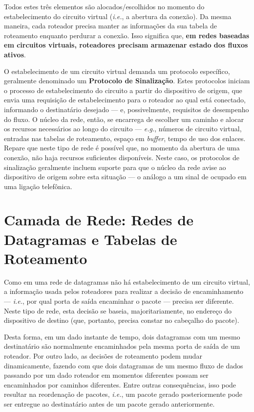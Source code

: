 \documentclass{article}
\begin{document}
Todos estes três elementos são alocados/escolhidos no momento do estabelecimento do circuito virtual (\textit{i.e.}, a abertura da conexão). Da mesma maneira, cada roteador precisa manter as informações da sua tabela de roteamento enquanto perdurar a conexão. Isso significa que, \textbf{em redes baseadas em circuitos virtuais, roteadores precisam armazenar estado dos fluxos ativos}.

O estabelecimento de um circuito virtual demanda um protocolo específico, geralmente denominado um \textbf{Protocolo de Sinalização}. Estes protocolos iniciam o processo de estabelecimento do circuito a partir do dispositivo de origem, que envia uma requisição de estabelecimento para o roteador ao qual está conectado, informando o destinatário desejado --- e, possivelmente, requisitos de desempenho do fluxo. O núcleo da rede, então, se encarrega de escolher um caminho e alocar os recursos necessários ao longo do circuito --- \textit{e.g.}, números de circuito virtual, entradas nas tabelas de roteamento, espaço em \textit{buffer}, tempo de uso dos enlaces. Repare que neste tipo de rede é possível que, no momento da abertura de uma conexão, não haja recursos suficientes disponíveis. Neste caso, os protocolos de sinalização geralmente incluem suporte para que o  núcleo da rede avise ao dispositivo de origem sobre esta situação --- o análogo a um sinal de ocupado em uma ligação telefônica.

\section{Camada de Rede: Redes de Datagramas e Tabelas de Roteamento}

Como em uma rede de datagramas não há estabelecimento de um circuito virtual, a informação usada pelos roteadores para realizar a decisão de encaminhamento --- \textit{i.e.}, por qual porta de saída encaminhar o pacote --- precisa ser diferente. Neste tipo de rede, esta decisão se baseia, majoritariamente, no endereço do dispositivo de destino (que, portanto, precisa constar no cabeçalho do pacote).

Desta forma, em um dado instante de tempo, dois datagramas com um mesmo destinatário são normalmente encaminhados pela mesma porta de saída de um roteador. Por outro lado, as decisões de roteamento podem mudar dinamicamente, fazendo com que dois datagramas de um mesmo fluxo de dados passando por um dado roteador em momentos diferentes possam ser encaminhados por caminhos diferentes. Entre outras consequências, isso pode resultar na reordenação de pacotes, \textit{i.e.}, um pacote gerado posteriormente pode ser entregue ao destinatário antes de um pacote gerado anteriormente.
\end{document}
